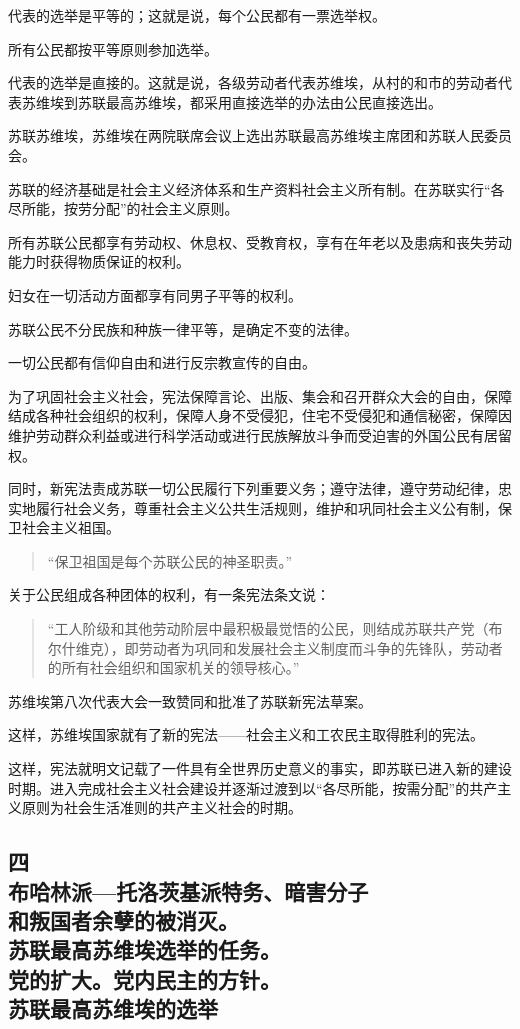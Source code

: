 代表的选举是平等的；这就是说，每个公民都有一票选举权。

所有公民都按平等原则参加选举。

代表的选举是直接的。这就是说，各级劳动者代表苏维埃，从村的和市的劳动者代表苏维埃到苏联最高苏维埃，都采用直接选举的办法由公民直接选出。

苏联苏维埃，苏维埃在两院联席会议上选出苏联最高苏维埃主席团和苏联人民委员会。

苏联的经济基础是社会主义经济体系和生产资料社会主义所有制。在苏联实行“各尽所能，按劳分配”的社会主义原则。

所有苏联公民都享有劳动权、休息权、受教育权，享有在年老以及患病和丧失劳动能力时获得物质保证的权利。

妇女在一切活动方面都享有同男子平等的权利。

苏联公民不分民族和种族一律平等，是确定不变的法律。

一切公民都有信仰自由和进行反宗教宣传的自由。

为了巩固社会主义社会，宪法保障言论、出版、集会和召开群众大会的自由，保障结成各种社会组织的权利，保障人身不受侵犯，住宅不受侵犯和通信秘密，保障因维护劳动群众利益或进行科学活动或进行民族解放斗争而受迫害的外国公民有居留权。

同时，新宪法责成苏联一切公民履行下列重要义务；遵守法律，遵守劳动纪律，忠实地履行社会义务，尊重社会主义公共生活规则，维护和巩同社会主义公有制，保卫社会主义祖国。

\begin{quotation}
“保卫祖国是每个苏联公民的神圣职责。”
\end{quotation}

关于公民组成各种团体的权利，有一条宪法条文说：

\begin{quotation}
“工人阶级和其他劳动阶层中最积极最觉悟的公民，则结成苏联共产党（布尔什维克），即劳动者为巩同和发展社会主义制度而斗争的先锋队，劳动者的所有社会组织和国家机关的领导核心。”
\end{quotation}

苏维埃第八次代表大会一致赞同和批准了苏联新宪法草案。

这样，苏维埃国家就有了新的宪法——社会主义和工农民主取得胜利的宪法。

这样，宪法就明文记载了一件具有全世界历史意义的事实，即苏联已进入新的建设时期。进入完成社会主义社会建设并逐渐过渡到以“各尽所能，按需分配”的共产主义原则为社会生活准则的共产主义社会的时期。


\subsection[四\q 布哈林派—托洛茨基派特务、暗害分子和叛国者余孽的被消灭。苏联最高苏维埃选举的任务。党的扩大。党内民主的方针。苏联最高苏维埃的选举]{四\\布哈林派—托洛茨基派特务、暗害分子\\和叛国者余孽的被消灭。\\苏联最高苏维埃选举的任务。\\党的扩大。党内民主的方针。\\苏联最高苏维埃的选举}

